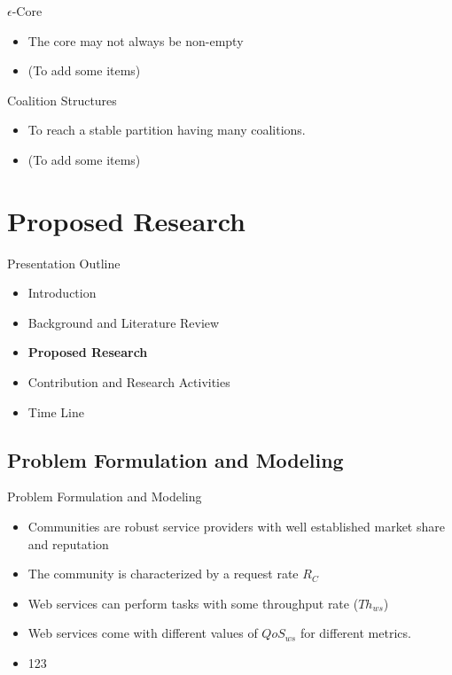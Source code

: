 \documentclass{beamer}
\begin{document}
\begin{frame}{$\epsilon$-Core}
    \begin{itemize}
        \item The core may not always be non-empty       
        \item (To add some items)
    \end{itemize}
\end{frame}
\begin{frame}{Coalition Structures}
    \begin{itemize}
        \item To reach a stable partition having many coalitions. 
        \item (To add some items)       
    \end{itemize}
\end{frame}

\section{Proposed Research}
\begin{frame}{Presentation Outline}
    \begin{itemize}
     	\itemsep=.5cm
    	\item Introduction
    	\item Background and Literature Review
    	\item {\bf Proposed Research}
        \item Contribution and Research Activities
    	\item Time Line
    \end{itemize}
\end{frame}

\subsection{Problem Formulation and Modeling}

\begin{frame}{Problem Formulation and Modeling}
    \begin{itemize}
        \item Communities are robust service providers with well established market share and reputation
        \item The community is characterized by a request rate $R_C$
        \item Web services can perform tasks with some throughput rate ($Th_{ws}$)
        \item Web services come with different values of $QoS_{ws}$ for different metrics.
        \item 123
    \end{itemize}    
\end{frame}
\end{document}
